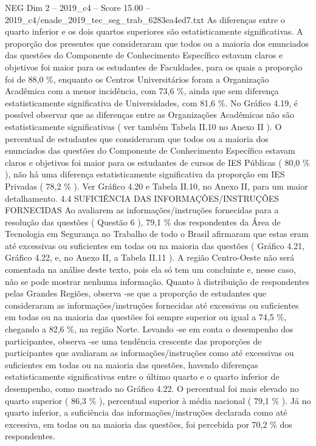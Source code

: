 \begin{textsample}{NEG Dim 2 – 2019\_c4 – Score 15.00 – 2019\_c4/enade\_2019\_tec\_seg\_trab\_6283ea4ed7.txt}
As diferenças entre o quarto inferior e os dois quartos superiores são estatisticamente significativas.
A proporção dos presentes que consideraram que todos ou a maioria dos enunciados das questões do Componente de Conhecimento Específico estavam claros e objetivos foi maior para os estudantes de Faculdades, para os quais a proporção foi de 88,0 \%, enquanto os Centros Universitários foram a Organização Acadêmica com a menor incidência, com 73,6 \%, ainda que sem diferença estatisticamente significativa de Universidades, com 81,6 \%.
No Gráfico 4.19, é possível observar que as diferenças entre as Organizações Acadêmicas não são estatisticamente significativas ( ver também Tabela II.10 no Anexo II ).
O percentual de estudantes que consideraram que todos ou a maioria dos enunciados das questões do Componente de Conhecimento Específico estavam claros e objetivos foi maior para os estudantes de cursos de IES Públicas ( 80,0 \% ), não há uma diferença estatisticamente significativa da proporção em IES Privadas ( 78,2 \% ).
Ver Gráfico 4.20 e Tabela II.10, no Anexo II, para um maior detalhamento. 4.4 SUFICIÊNCIA DAS INFORMAÇÕES/INSTRUÇÕES FORNECIDAS Ao avaliarem as informações/instruções fornecidas para a resolução das questões ( Questão 6 ), 79,1 \% dos respondentes da Área de Tecnologia em Segurança no Trabalho de todo o Brasil afirmaram que estas eram até excessivas ou suficientes em todas ou na maioria das questões ( Gráfico 4.21, Gráfico 4.22, e, no Anexo II, a Tabela II.11 ).
A região Centro-Oeste não será comentada na análise deste texto, pois ela só tem um concluinte e, nesse caso, não se pode mostrar nenhuma informação.
Quanto à distribuição de respondentes pelas Grandes Regiões, observa -se que a proporção de estudantes que consideraram as informações/instruções fornecidas até excessivas ou suficientes em todas ou na maioria das questões foi sempre superior ou igual a 74,5 \%, chegando a 82,6 \%, na região Norte.
Levando -se em conta o desempenho dos participantes, observa -se uma tendência crescente das proporções de participantes que avaliaram as informações/instruções como até excessivas ou suficientes em todas ou na maioria das questões, havendo diferenças estatisticamente significativas entre o último quarto e o quarto inferior de desempenho, como mostrado no Gráfico 4.22.
O percentual foi mais elevado no quarto superior ( 86,3 \% ), percentual superior à média nacional ( 79,1 \% ).
Já no quarto inferior, a suficiência das informações/instruções declarada como até excessiva, em todas ou na maioria das questões, foi percebida por 70,2 \% dos respondentes.

\end{textsample}
